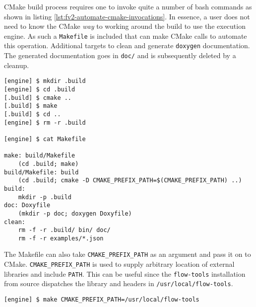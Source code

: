 CMake build process requires one to invoke quite a number of bash commands as
shown in listing \ref{lst:fv2-automate-cmake-invocations}. In essence, a user
does not need to know the CMake \emph{way} to working around the build to use
the execution  engine. As such a
\texttt{Makefile} is included that can make CMake calls to automate this
operation. Additional targets to clean and generate \texttt{doxygen}
documentation. The generated documentation goes in \texttt{doc/} and is
subsequently deleted by a cleanup.

\begin{lstlisting}
[engine] $ mkdir .build
[engine] $ cd .build
[.build] $ cmake ..
[.build] $ make
[.build] $ cd ..
[engine] $ rm -r .build

[engine] $ cat Makefile

make: build/Makefile
    (cd .build; make)
build/Makefile: build
    (cd .build; cmake -D CMAKE_PREFIX_PATH=$(CMAKE_PREFIX_PATH) ..)
build:
    mkdir -p .build
doc: Doxyfile
    (mkdir -p doc; doxygen Doxyfile)
clean:
    rm -f -r .build/ bin/ doc/
    rm -f -r examples/*.json
\end{lstlisting}

The Makefile can also take \texttt{CMAKE\_PREFIX\_PATH} as an argument and
pass it on to CMake. \texttt{CMAKE\_PREFIX\_PATH} is used to supply arbitrary
 location of external libraries and include
\texttt{PATH}. This can be useful since the \texttt{flow-tools} installation
from source dispatches the library and headers in
\texttt{/usr/local/flow-tools}.

\begin{lstlisting}
[engine] $ make CMAKE_PREFIX_PATH=/usr/local/flow-tools
\end{lstlisting}





